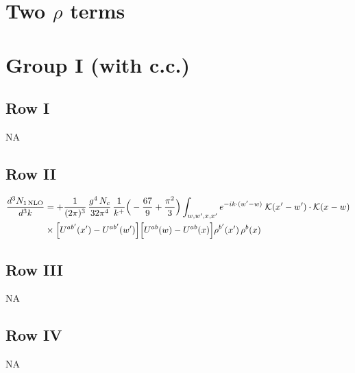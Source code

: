 \documentclass[9pt]{article}
\numberwithin{equation}{section}
\begin{document}
\section*{Two $\rho$ terms}
\section{Group I (with c.c.)}
\subsection{Row I}
\textsc{NA}
\subsection{Row II}
\begin{align}
\frac{d^{3}N_{1\,\rm NLO}}{d^{3}k} & = +\frac{1}{(2\pi)^{3}}\,\frac{g^{4}\,N_{c}}{32\pi^{4}}\,\frac{1}{k^{+}}\Big(-\frac{67}{9}+\frac{\pi^{2}}{3}\Big)\int_{w,w',x,x'} e^{-ik\cdot(w'-w)}\;\mathcal{K}(x'-w')\cdot\mathcal{K}(x-w)\notag \\
& \times\Big[U^{ab'}(x')-U^{ab'}(w')\Big]\Big[U^{ab}(w)-U^{ab}(x)\Big]\rho^{b'}(x')\,\rho^{b}(x)
\end{align}
\subsection{Row III}
\textsc{NA}
\subsection{Row IV}
\textsc{NA}
\end{document}
